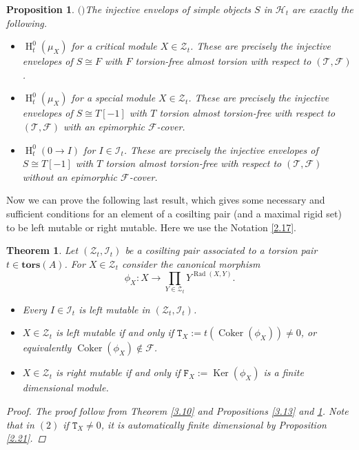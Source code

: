 \documentclass[12pt]{amsart}
\numberwithin{equation}{section}
\newtheorem{theorem}[lemma]{Theorem}
\newtheorem{proposition}[lemma]{Proposition}
\theoremstyle{definition}
\DeclareMathOperator{\Ker}{Ker}
\DeclareMathOperator{\Coker}{Coker}
\DeclareMathOperator{\HH}{H}
\DeclareMathOperator{\Rad}{Rad}
\newtheorem*{theorem 0*}{Theorem}
\newtheorem*{theorem a*}{Theorem A}
\newtheorem*{theorem b*}{Theorem B}
\numberwithin{diagram}{section}
\begin{document}
\begin{proposition}$($\cite[Corollary 4.11]{ALS2}$)$\label{3.14}
   The injective envelops of simple objects $S$ in $\mathcal{H}_t$ are exactly the following.
   \begin{itemize}
       \item[(1)]
       $\HH^0_t(\mu_X)$ for a critical module $X\in\mathcal{Z}_t$. These are precisely the injective envelopes of $S\cong F$ with $F$ torsion-free almost torsion with respect to $(\mathcal{T},\mathcal{F})$.
       \item[(2)]
       $\HH^0_t(\mu_X)$ for a special module $X\in\mathcal{Z}_t$. These are precisely the injective envelopes of $S\cong T[-1]$ with $T$ torsion almost torsion-free with respect to $(\mathcal{T},\mathcal{F})$ with an epimorphic $\mathcal{F}$-cover.
       \item[(3)]
       $\HH^0_t(0\rightarrow I)$ for $I\in\mathcal{I}_t$. These are precisely the injective envelopes of $S\cong T[-1]$ with $T$ torsion almost torsion-free with respect to $(\mathcal{T},\mathcal{F})$ without an epimorphic $\mathcal{F}$-cover.
   \end{itemize}
\end{proposition}
	
Now we can prove the following last result, which gives some necessary and sufficient conditions for an element of a cosilting pair (and a maximal rigid set) to be left mutable or right mutable. Here we use the Notation \ref{2.17}.

\begin{theorem}\label{3.15}
Let $(\mathcal{Z}_t,\mathcal{I}_t)$ be a cosilting pair associated to a torsion pair $t\in\textbf{tors}(A)$. For $X\in\mathcal{Z}_t$ consider the canonical morphism
    \begin{equation*}
		\phi_X:X\longrightarrow \prod_{Y\in\mathcal{Z}_t}Y^{\Rad(X,Y)}.
		\end{equation*}
   	\begin{itemize}
\item[(1)]
Every $I\in\mathcal{I}_t$ is left mutable in $(\mathcal{Z}_t,\mathcal{I}_t)$.
\item[(2)]
$X\in\mathcal{Z}_t$ is left mutable if and only if $\mathtt{T}_X:=t(\Coker(\phi_X))\neq 0$, or equivalently                   $\Coker(\phi_X)\notin \mathcal{F}$.
\item[(3)]
$X\in\mathcal{Z}_t$ is right mutable if and only if $\mathtt{F}_X:=\Ker(\phi_X)$ is a finite dimensional module.
\end{itemize}
\begin{proof}
The proof follow from Theorem \ref{3.10} and Propositions \ref{3.13} and \ref{3.14}. Note that in $(2)$ if $\mathtt{T}_X\neq 0$, it is automatically finite dimensional by Proposition \ref{2.21}.
\end{proof}
\end{theorem}
	
\end{document}
